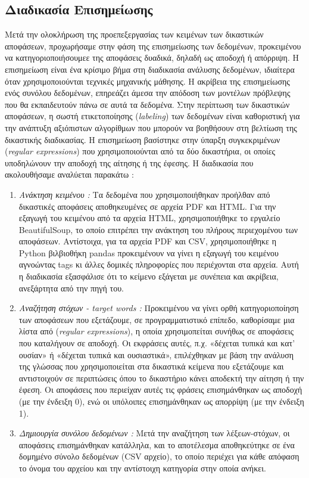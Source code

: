 \documentclass[diploma]{softlab-thesis}
\begin{document}
\begin{enumerate}
\section{Διαδικασία Επισημείωσης}

Μετά την ολοκλήρωση της προεπεξεργασίας των κειμένων των δικαστικών αποφάσεων, προχωρήσαμε στην φάση της επισημείωσης των δεδομένων, προκειμένου να κατηγοριοποιήσουμεε της αποφάσεις δυαδικά, δηλαδή ως αποδοχή ή απόρριψη. Η επισημείωση είναι ένα κρίσιμο βήμα στη διαδικασία ανάλυσης δεδομένων, ιδιαίτερα όταν χρησιμοποιούνται τεχνικές μηχανικής μάθησης. Η ακρίβεια της επισημείωσης ενός συνόλου δεδομένων, επηρεάζει άμεσα την απόδοση των μοντέλων πρόβλεψης που θα εκπαιδευτούν πάνω σε αυτά τα δεδομένα. Στην περίπτωση των δικαστικών αποφάσεων, η σωστή ετικετοποίησης (\textit{labeling}) των δεδομένων είναι καθοριστική για την ανάπτυξη αξιόπιστων αλγορίθμων που μπορούν να βοηθήσουν στη βελτίωση της δικαστικής διαδικασίας. 
Η επισημείωση βασίστηκε στην ύπαρξη συγκεκριμένων  (\textit{regular expressions}) που χρησιμοποιούνται από τα δύο δικαστήρια, οι οποίες υποδηλώνουν την αποδοχή της αίτησης ή της έφεσης. Η διαδικασία που ακολουθήσαμε αναλύεται παρακάτω :

\begin{enumerate}
\item \textit{Ανάκτηση κειμένου :} Τα δεδομένα που χρησιμοποιήθηκαν προήλθαν από δικαστικές αποφάσεις αποθηκευμένες σε αρχεία PDF και HTML. Για την εξαγωγή του κειμένου από τα αρχεία HTML, χρησιμοποιήθηκε το εργαλείο BeautifulSoup, το οποίο επιτρέπει την ανάκτηση του πλήρους περιεχομένου των αποφάσεων. Αντίστοιχα, για τα αρχεία PDF και CSV, χρησιμοποιήθηκε η Python βιλβιοθήκη pandas προκειμένουν να γίνει η εξαγωγή του κειμένου αγνοώντας tags κι άλλες δομικές πληροφορίες που περιέχονται στα αρχεία. Αυτή η διαδικασία εξασφάλισε ότι το κείμενο εξάγεται με συνέπεια και ακρίβεια, ανεξάρτητα από την πηγή του.
\item \textit{Αναζήτηση στόχων - target words :} Προκειμένου να γίνει ορθή κατηγοριοποίηση των αποφάσεων που εξετάζουμε, σε προγραμματιστικό επίπεδο, καθορίσαμε μια λίστα από (\textit{regular expressions}), η οποία χρησιμοπείται συνήθως σε αποφάσεις που καταλήγουν σε αποδοχή. Οι εκφράσεις αυτές, π.χ. «δέχεται τυπικά και κατ’ ουσίαν» ή «δέχεται τυπικά και ουσιαστικά», επιλέχθηκαν με βάση την ανάλυση της γλώσσας που χρησιμοποιείται στα δικαστικά κείμενα που εξετάζουμε και αντιστοιχούν σε περιπτώσεις όπου το δικαστήριο κάνει αποδεκτή την αίτηση ή την έφεση. Οι αποφάσεις που περιείχαν αυτές τις φράσεις επισημάνθηκαν ως αποδοχή (με την ένδειξη 0), ενώ οι υπόλοιπες επισημάνθηκαν ως απορρίψη (με την ένδειξη 1).
\item \textit{Δημιουργία συνόλου δεδομένων :} Μετά την αναζήτηση των λέξεων-στόχων, οι αποφάσεις επισημάνθηκαν κατάλληλα, και το αποτέλεσμα αποθηκεύτηκε σε ένα δομημένο σύνολο δεδομένων (CSV αρχείο), το οποίο περιέχει για κάθε απόφαση το όνομα του αρχείου και την αντίστοιχη κατηγορία στην οποία ανήκει.



\end{enumerate}
\end{enumerate}
\end{document}
